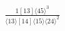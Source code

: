 \documentclass[varwidth, border=5pt]{standalone}
\begin{document}
\begin{my}
$\begin{gathered}
\scriptscriptstyle\frac{1[13]⟨45⟩^3}{⟨13⟩[14]⟨15⟩⟨24⟩^2}
\end{gathered}$
\end{my}
\end{document}
